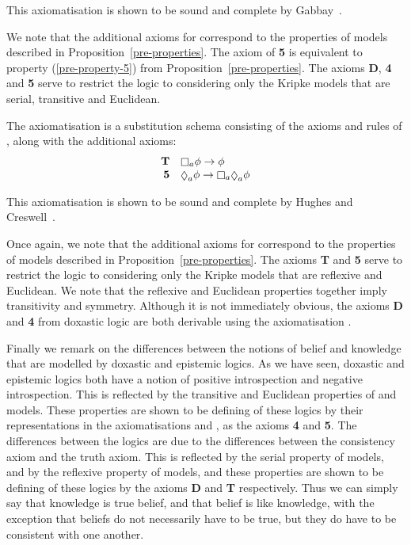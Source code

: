 This axiomatisation is shown to be sound and complete by
Gabbay~\cite{gabbay2003many}.

We note that the additional axioms for \axiomKD{} correspond to the properties
of \classKD{} models described in Proposition~\ref{pre-properties}. The axiom of
{\bf 5} is equivalent to property (\ref{pre-property-5}) from
Proposition~\ref{pre-properties}. The axioms {\bf D}, {\bf 4} and {\bf 5} serve
to restrict the logic to considering only the Kripke models that are serial,
transitive and Euclidean.

\begin{definition}
The axiomatisation \axiomS{} is a substitution schema consisting of the axioms
and rules of \axiomK{}, along with the additional axioms:
$$
\begin{array}{rl}
{\bf T} & \knows_a \phi \implies \phi\\
{\bf 5} & \suspects_a \phi \implies \knows_a \suspects_a \phi\\
\end{array}
$$
\end{definition}

This axiomatisation is shown to be sound and complete by Hughes and
Creswell~\cite{hughes1996new}.

Once again, we note that the additional axioms for \axiomS{} correspond to the
properties of \classS{} models described in Proposition~\ref{pre-properties}.
The axioms {\bf T} and {\bf 5} serve to restrict the logic to considering only
the Kripke models that are reflexive and Euclidean.  We note that the reflexive
and Euclidean properties together imply transitivity and symmetry. Although it
is not immediately obvious, the axioms {\bf D} and {\bf 4} from doxastic logic
are both derivable using the axiomatisation \axiomS{}.

Finally we remark on the differences between the notions of belief and knowledge
that are modelled by doxastic and epistemic logics. As we have seen, doxastic
and epistemic logics both have a notion of positive introspection and negative
introspection. This is reflected by the transitive and Euclidean properties of
\classKD{} and \classS{} models. These properties are shown to be defining of
these logics by their representations in the axiomatisations \axiomKD{} and
\axiomS{}, as the axioms {\bf 4} and {\bf 5}. The differences between the logics
are due to the differences between the consistency axiom and the truth axiom.
This is reflected by the serial property of \classKD{} models, and by the
reflexive property of \classS{} models, and these properties are shown to be
defining of these logics by the axioms {\bf D} and {\bf T} respectively. Thus we
can simply say that knowledge is true belief, and that belief is like knowledge,
with the exception that beliefs do not necessarily have to be true, but they do
have to be consistent with one another.

